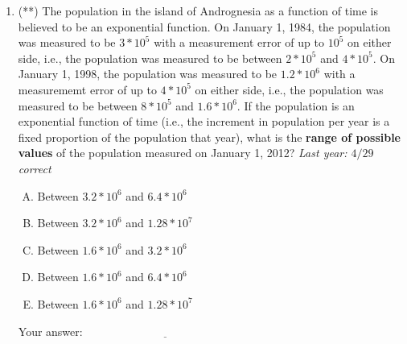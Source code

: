 \documentclass[10pt]{amsart}
\begin{document}
\begin{enumerate}
\item (**) The population in the island of Andrognesia as a function
  of time is believed to be an exponential function. On January 1,
  1984, the population was measured to be $3 * 10^5$ with a
  measurement error of up to $10^5$ on either side, i.e., the
  population was measured to be between $2* 10^5$ and $4 * 10^5$. On
  January 1, 1998, the population was measured to be $1.2 * 10^6$ with
  a measurememt error of up to $4 * 10^5$ on either side, i.e., the
  population was measured to be between $8 * 10^5$ and $1.6 *
  10^6$. If the population is an exponential function of time (i.e.,
  the increment in population per year is a fixed proportion of the
  population that year), what is the {\bf range of possible values} of
  the population measured on January 1, 2012? {\em Last year: $4/29$
  correct}

  \begin{enumerate}[(A)]
  \item Between $3.2 * 10^6$ and $6.4 * 10^6$
  \item Between $3.2 * 10^6$ and $1.28 * 10^7$
  \item Between $1.6 * 10^6$ and $3.2 * 10^6$
  \item Between $1.6 * 10^6$ and $6.4 * 10^6$
  \item Between $1.6 * 10^6$ and $1.28 * 10^7$
  \end{enumerate}

  \vspace{0.1in}
  Your answer: $\underline{\qquad\qquad\qquad\qquad\qquad\qquad\qquad}$
  \vspace{0.1in}

\end{enumerate}
\end{document}
